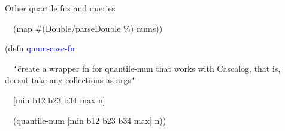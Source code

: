\documentclass{beamer}
\renewcommand{\textquotedbl}{\texttt{\char`\"}}
\begin{document}
\begin{frame}[allowframebreaks]{Other quartile fns and queries}
\begin{small}
{\ttfamily\color{black}
\ \ \textcolor[rgb]{0.54901963,0.54901963,0.54901963}{(}\textcolor[rgb]{0.28235295,0.23921569,0.54509807}{map}
\#\textcolor[rgb]{0.54901963,0.54901963,0.54901963}{(}\textcolor[rgb]{0.28235295,0.23921569,0.54509807}{Double/parseDouble}
\%\textcolor[rgb]{0.54901963,0.54901963,0.54901963}{)}
nums\textcolor[rgb]{0.54901963,0.54901963,0.54901963}{))}}

\bigskip

{\ttfamily\color{black}
\textcolor[rgb]{0.54901963,0.54901963,0.54901963}{(}\textcolor[rgb]{0.49803922,0.0,0.49803922}{defn}
\textcolor{blue}{qnum-casc-fn}}

{\ttfamily\color{black}
\ \ \textcolor[rgb]{0.54509807,0.13333334,0.32156864}{{\textquotedbl}create
a wrapper fn for quantile-num that works with Cascalog, that is,
doesn{\textquotesingle}t take any collections as args{\textquotedbl}}}

{\ttfamily\color{black}
\ \ [min b12 b23 b34 max n]}

{\ttfamily\color{black}
\ \ \textcolor[rgb]{0.54901963,0.54901963,0.54901963}{(}quantile-num
[min b12 b23 b34 max]
n\textcolor[rgb]{0.54901963,0.54901963,0.54901963}{))}}
\end{small}
\end{frame}
\end{document}
